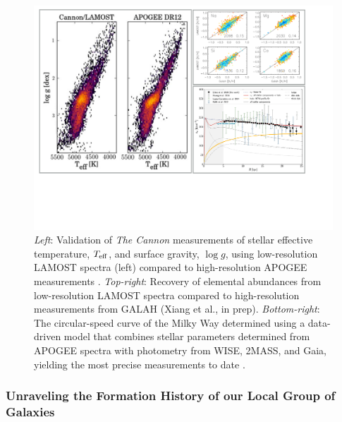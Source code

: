 \documentclass[oneside,11pt]{amsart}
\begin{document}
\begin{figure}[h!]
%
\vskip -0.1in
%
\includegraphics[width=\textwidth]{figs/LGplots}
%
\caption{{\it Left}: Validation of {\it The Cannon} measurements of
stellar effective temperature, $T_{\rm eff}$, and surface gravity, $\log
g$, using low-resolution LAMOST spectra (left) compared to
high-resolution APOGEE measurements
\citep[right;][]{2017ApJ...836....5H}. {\it Top-right}: Recovery of
elemental abundances from low-resolution LAMOST spectra compared to
high-resolution measurements from GALAH (Xiang et al., in prep).  {\it
Bottom-right}: The circular-speed curve of the Milky Way determined
using a data-driven model that combines stellar parameters determined
from APOGEE spectra with photometry from WISE, 2MASS, and Gaia, yielding
the most precise measurements to date \citep{2019ApJ...871..120E}.}
%
\label{fig:Cannon}
%
\end{figure}

\subsubsection{Unraveling the Formation History of our Local Group of Galaxies}
\label{sec:localgroup}
\end{document}
